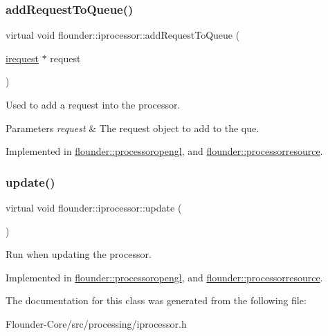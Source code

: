 \subsubsection{\texorpdfstring{add\+Request\+To\+Queue()}{addRequestToQueue()}}
{\footnotesize\ttfamily virtual void flounder\+::iprocessor\+::add\+Request\+To\+Queue (\begin{DoxyParamCaption}\item[{\hyperlink{classflounder_1_1irequest}{irequest} $\ast$}]{request }\end{DoxyParamCaption})\hspace{0.3cm}{\ttfamily [pure virtual]}}



Used to add a request into the processor. 


\begin{DoxyParams}{Parameters}
{\em request} & The request object to add to the que. \\
\hline
\end{DoxyParams}


Implemented in \hyperlink{classflounder_1_1processoropengl_a5063ad5c1f350f26733a748a7e039a9a}{flounder\+::processoropengl}, and \hyperlink{classflounder_1_1processorresource_a4ae0dda615f98e93faadda22e74d61e2}{flounder\+::processorresource}.

\mbox{\label{classflounder_1_1iprocessor_ad2edfece3465ec3dbe0a5feac26bdbc3}} 
\subsubsection{\texorpdfstring{update()}{update()}}
{\footnotesize\ttfamily virtual void flounder\+::iprocessor\+::update (\begin{DoxyParamCaption}{ }\end{DoxyParamCaption})\hspace{0.3cm}{\ttfamily [pure virtual]}}



Run when updating the processor. 



Implemented in \hyperlink{classflounder_1_1processoropengl_ad3ca7ada749d785e44fa2b536839f684}{flounder\+::processoropengl}, and \hyperlink{classflounder_1_1processorresource_afaeb27a9673c1f9b4366b537b7c0d377}{flounder\+::processorresource}.



The documentation for this class was generated from the following file\+:\begin{DoxyCompactItemize}
\item 
Flounder-\/\+Core/src/processing/iprocessor.\+h\end{DoxyCompactItemize}

